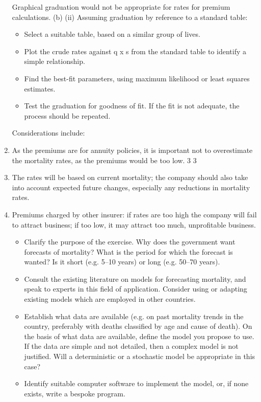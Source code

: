 \documentclass[a4paper,12pt]{article}
\begin{document}
\begin{enumerate}
Graphical graduation would not be appropriate for rates for premium calculations.
(b)
(ii)
Assuming graduation by reference to a standard table:
\begin{itemize}
\item Select a suitable table, based on a similar group of lives.
\item Plot the crude rates against q x s from the standard table to identify a simple relationship.
\item Find the best-fit parameters, using maximum likelihood or least squares estimates.
\item Test the graduation for goodness of fit. If the fit is not adequate, the process should be repeated.
\end{itemize}
Considerations include:
\item
As the premiums are for annuity policies, it is important not to
overestimate the mortality rates, as the premiums would be too low.
3
3
\item The rates will be based on current mortality; the company should also take into account expected future changes, especially any reductions in
mortality rates.
\item Premiums charged by other insurer: if rates are too high the company will
fail to attract business; if too low, it may attract too much, unprofitable
business.
\begin{itemize}
\item Clarify the purpose of the exercise. Why does the government want forecasts of
mortality? What is the period for which the forecast is wanted? Is it short (e.g. 5–10
years) or long (e.g. 50–70 years).
\item Consult the existing literature on models for forecasting mortality, and speak to
experts in this field of application. Consider using or adapting existing models which are employed in other countries.
\item Establish what data are available (e.g. on past mortality trends in the country,
preferably with deaths classified by age and cause of death).
On the basis of what data are available, define the model you propose to use. If the
data are simple and not detailed, then a complex model is not justified. Will a
deterministic or a stochastic model be appropriate in this case?
\item Identify suitable computer software to implement the model, or, if none exists, write a
bespoke program.

\end{itemize}
\end{enumerate}
\end{document}
